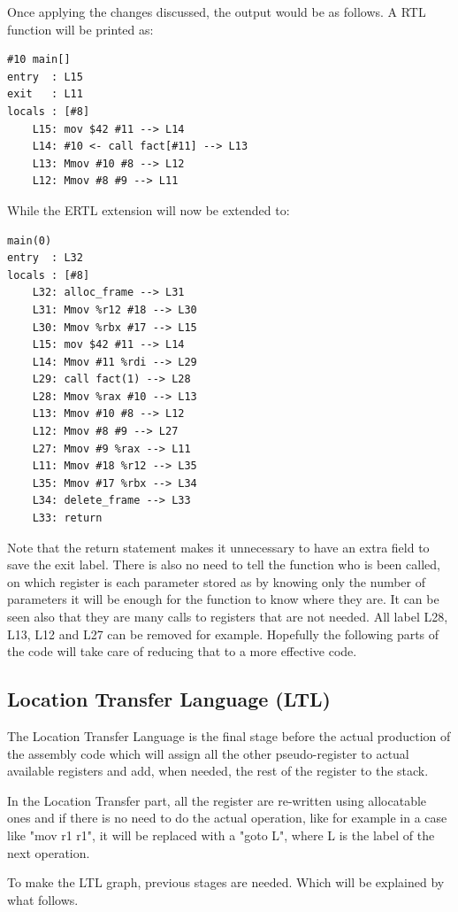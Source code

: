 \documentclass[conference]{IEEEtran}
\theoremstyle{definition}
\begin{document}
Once applying the changes discussed, the output would be as follows. A RTL function will be printed as:

\begin{lstlisting}
#10 main[]
entry  : L15
exit   : L11
locals : [#8]
	L15: mov $42 #11 --> L14
	L14: #10 <- call fact[#11] --> L13
	L13: Mmov #10 #8 --> L12
	L12: Mmov #8 #9 --> L11
\end{lstlisting}

While the ERTL extension will now be extended to:

\begin{lstlisting}
main(0)
entry  : L32
locals : [#8]
	L32: alloc_frame --> L31 
	L31: Mmov %r12 #18 --> L30 
	L30: Mmov %rbx #17 --> L15
	L15: mov $42 #11 --> L14
	L14: Mmov #11 %rdi --> L29
	L29: call fact(1) --> L28 
	L28: Mmov %rax #10 --> L13 
	L13: Mmov #10 #8 --> L12 
	L12: Mmov #8 #9 --> L27 
	L27: Mmov #9 %rax --> L11 
	L11: Mmov #18 %r12 --> L35 
	L35: Mmov #17 %rbx --> L34
	L34: delete_frame --> L33 
	L33: return
\end{lstlisting}

Note that the return statement makes it unnecessary to have an extra field to save the exit label. There is also no need to tell the function who is been called, on which register is each parameter stored as by knowing only the number of parameters it will be enough for the function to know where they are. It can be seen also that they are many calls to registers that are not needed. All label L28, L13, L12 and L27 can be removed for example. Hopefully the following parts of the code will take care of reducing that to a more effective code.

\subsection{Location Transfer Language (LTL)}

The Location Transfer Language is the final stage before the actual production of the assembly code which will assign all the other pseudo-register to actual available registers and add, when needed, the rest of the register to the stack.

In the Location Transfer part, all the register are re-written using allocatable ones and if there is no need to do the actual operation, like for example in a case like "mov r1 r1", it will be replaced with a "goto L", where L is the label of the next operation.

To make the LTL graph, previous stages are needed. Which will be explained by what follows.
\end{document}
